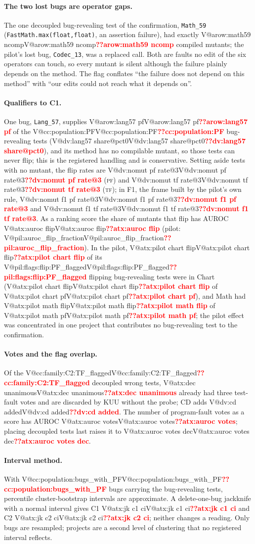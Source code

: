 \documentclass[pdflatex,iicol,sn-mathphys-num]{sn-jnl}
\makeatletter
\newcommand{\V}[1]{\ifcsname V@#1\endcsname\csname V@#1\endcsname\else\textbf{\textcolor{red}{??#1}}\fi}
\newcommand{\PF}{\textsc{pf}}
\newcommand{\TF}{\textsc{tf}}
\makeatother
\begin{document}
\paragraph{The two lost bugs are operator gaps.} The one decoupled bug-revealing test of the confirmation, \texttt{Math\_59} (\texttt{FastMath.max(float,float)}, an assertion failure), had exactly \V{arow:math59 ncomp} compiled mutants; the pilot's lost bug, \texttt{Codec\_13}, was a replaced call. Both are faults no edit of the six operators can touch, so every mutant is silent although the failure plainly depends on the method. The flag conflates ``the failure does not depend on this method'' with ``our edits could not reach what it depends on''.

\paragraph{Qualifiers to C1.} One bug, \texttt{Lang\_57}, supplies \V{arow:lang57 pf} of the \V{cc:population:PF} bug-revealing tests (\V{dv:lang57 share@pct0}), and its method has no compilable mutant, so those tests can never flip; this is the registered handling and is conservative. Setting aside tests with no mutant, the flip rates are \V{dv:nomut pf rate@3} (\PF) and \V{dv:nomut tf rate@3} (\TF); in F1, the frame built by the pilot's own rule, \V{dv:nomut f1 pf rate@3} and \V{dv:nomut f1 tf rate@3}. As a ranking score the share of mutants that flip has AUROC \V{atx:auroc flip} (pilot: \V{pil:auroc_flip_fraction}). In the pilot, \V{atx:pilot chart flip} of its \V{pil:flags:flip:PF_flagged} flipping bug-revealing tests were in Chart (\V{atx:pilot chart flip} of \V{atx:pilot chart pf}), and Math had \V{atx:pilot math flip} of \V{atx:pilot math pf}; the pilot effect was concentrated in one project that contributes no bug-revealing test to the confirmation.

\paragraph{Votes and the flag overlap.} Of the \V{cc:family:C2:TF_flagged} decoupled wrong tests, \V{atx:dec unanimous} already had three test-fault votes and are discarded by KUU without the probe; CD adds \V{dv:cd added}. The number of program-fault votes as a score has AUROC \V{atx:auroc votes}; placing decoupled tests last raises it to \V{atx:auroc votes dec}.

\paragraph{Interval method.} With \V{cc:population:bugs_with_PF} bugs carrying the bug-revealing tests, percentile cluster-bootstrap intervals are approximate. A delete-one-bug jackknife with a normal interval gives C1 \V{atx:jk c1 ci} and C2 \V{atx:jk c2 ci}; neither changes a reading. Only bugs are resampled; projects are a second level of clustering that no registered interval reflects.
\end{document}
